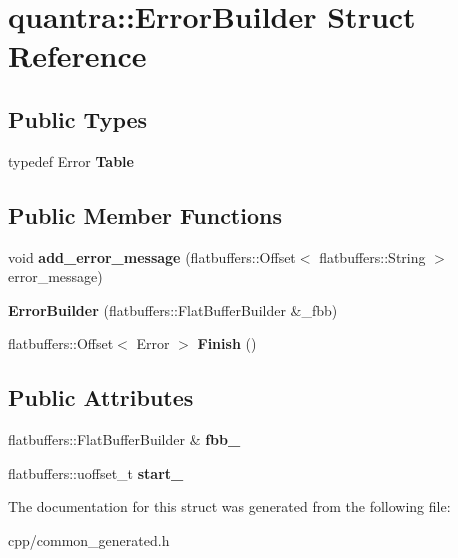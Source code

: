 \hypertarget{structquantra_1_1ErrorBuilder}{}\section{quantra\+:\+:Error\+Builder Struct Reference}
\label{structquantra_1_1ErrorBuilder}
\subsection*{Public Types}
\begin{DoxyCompactItemize}
\item 
\mbox{\label{structquantra_1_1ErrorBuilder_ab05ad5e246e277dffad23216534bed76}} 
typedef Error {\bfseries Table}
\end{DoxyCompactItemize}
\subsection*{Public Member Functions}
\begin{DoxyCompactItemize}
\item 
\mbox{\label{structquantra_1_1ErrorBuilder_a20256a033d91a51f2bc10b08da0d1375}} 
void {\bfseries add\+\_\+error\+\_\+message} (flatbuffers\+::\+Offset$<$ flatbuffers\+::\+String $>$ error\+\_\+message)
\item 
\mbox{\label{structquantra_1_1ErrorBuilder_a27209af37e76fdf1b96a870aae269549}} 
{\bfseries Error\+Builder} (flatbuffers\+::\+Flat\+Buffer\+Builder \&\+\_\+fbb)
\item 
\mbox{\label{structquantra_1_1ErrorBuilder_a708e60a0c85fe047e8a6c4c93a0f84e0}} 
flatbuffers\+::\+Offset$<$ Error $>$ {\bfseries Finish} ()
\end{DoxyCompactItemize}
\subsection*{Public Attributes}
\begin{DoxyCompactItemize}
\item 
\mbox{\label{structquantra_1_1ErrorBuilder_a075f67793d6bc0c95d28ab5ca85ddfab}} 
flatbuffers\+::\+Flat\+Buffer\+Builder \& {\bfseries fbb\+\_\+}
\item 
\mbox{\label{structquantra_1_1ErrorBuilder_a78c963c0e800152470902a72c4c76e4b}} 
flatbuffers\+::uoffset\+\_\+t {\bfseries start\+\_\+}
\end{DoxyCompactItemize}


The documentation for this struct was generated from the following file\+:\begin{DoxyCompactItemize}
\item 
cpp/common\+\_\+generated.\+h\end{DoxyCompactItemize}
